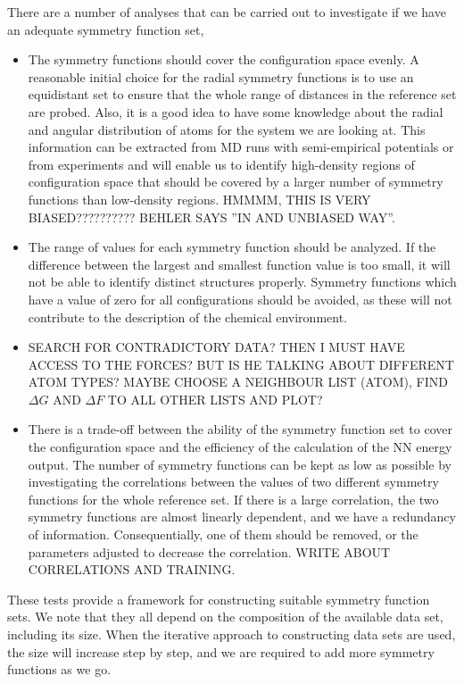 \documentclass[twoside,english]{uiofysmaster}
\begin{document}
There are a number of analyses that can be carried out to investigate if we have an adequate
symmetry function set,
\begin{itemize}
 \item The symmetry functions should cover the configuration space evenly. 
 A reasonable initial choice for the radial symmetry functions is to use an equidistant set to ensure 
 that the whole range of distances in the reference set are probed. Also, it is a good idea 
 to have some knowledge about the radial and angular distribution of atoms for the system we are looking at. 
 This information can be extracted from MD runs with semi-empirical potentials or from experiments and will enable
 us to identify high-density regions of configuration space that should be covered by a larger number
 of symmetry functions than low-density regions. HMMMM, THIS IS VERY BIASED?????????? BEHLER SAYS ''IN AND UNBIASED WAY''.
 \item The range of values for each symmetry function should be analyzed. If the difference between the largest
 and smallest function value is too small, it will not be able to identify distinct structures properly. 
 Symmetry functions which have a value of zero for all configurations should be avoided, as these will not contribute
 to the description of the chemical environment. 
 \item SEARCH FOR CONTRADICTORY DATA? THEN I MUST HAVE ACCESS TO THE FORCES? BUT IS HE TALKING ABOUT DIFFERENT 
 ATOM TYPES? MAYBE CHOOSE A NEIGHBOUR LIST (ATOM), FIND $\Delta G$ AND $\Delta F$ TO ALL OTHER LISTS AND PLOT?
 \item There is a trade-off between the ability of the symmetry function set to cover the configuration space and 
 the efficiency of the calculation of the NN energy output. The number of symmetry functions can be kept as low as
 possible by investigating the correlations between the values of two different symmetry functions for the whole
 reference set. If there is a large correlation, the two symmetry functions are almost linearly dependent, 
 and we have a redundancy of information. Consequentially, one of them should be removed, or the parameters adjusted
 to decrease the correlation. WRITE ABOUT CORRELATIONS AND TRAINING. 
\end{itemize}
These tests provide a framework for constructing suitable symmetry function sets. 
We note that they all depend on the composition of the available data set, including its size. 
When the iterative approach to constructing data sets are used, the size will increase step by step, 
and we are required to add more symmetry functions as we go. 
\end{document}
